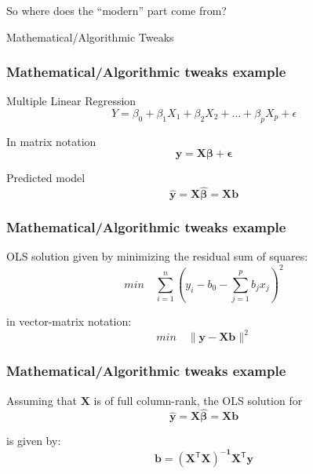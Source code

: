 \documentclass[12pt]{beamer}\usepackage[]{graphicx}\usepackage[]{color}
\begin{document}

\begin{frame}
\begin{center}
{\lolit So where does the ``modern'' part come from?}

\Large{\mdlit Mathematical/Algorithmic Tweaks}
\end{center}
\end{frame}


\begin{frame}
\frametitle{Mathematical/Algorithmic tweaks example}

Multiple Linear Regression
$$
Y = \beta_0 + \beta_1 X_1 + \beta_2 X_2 + \dots + \beta_p X_p + \epsilon
$$

In matrix notation
$$
\mathbf{y} = \mathbf{X} \boldsymbol{\beta} + \boldsymbol{\epsilon}
$$

\pause
Predicted model 
$$
\mathbf{\hat{y}} = \mathbf{X} \boldsymbol{\hat{\beta}} = \mathbf{X b}
$$

\end{frame}


\begin{frame}
\frametitle{Mathematical/Algorithmic tweaks example}

OLS solution given by minimizing the residual sum of squares:
$$
min \quad \sum_{i=1}^{n} \left ( y_i - b_0 - \sum_{j=1}^{p} b_j x_j \right )^2
$$

in vector-matrix notation:
$$
min \quad \| \mathbf{y - Xb} \|^2
$$

\end{frame}


\begin{frame}
\frametitle{Mathematical/Algorithmic tweaks example}

Assuming that $\mathbf{X}$ is of full column-rank, the OLS solution for
$$
\mathbf{\hat{y}} = \mathbf{X} \boldsymbol{\hat{\beta}} = \mathbf{X b}
$$

is given by:
$$
\mathbf{b} = \mathbf{(X^\mathsf{T} X)^{-1} X^{\mathsf{T}} y}
$$

\end{frame}

\end{document}
